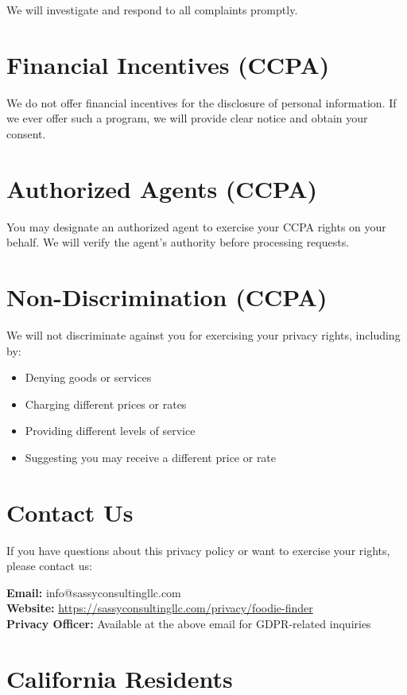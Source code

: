 \documentclass[11pt,letterpaper]{article}
\begin{document}
We will investigate and respond to all complaints promptly.

\section{Financial Incentives (CCPA)}

We do not offer financial incentives for the disclosure of personal information. If we ever offer such a program, we will provide clear notice and obtain your consent.

\section{Authorized Agents (CCPA)}

You may designate an authorized agent to exercise your CCPA rights on your behalf. We will verify the agent's authority before processing requests.

\section{Non-Discrimination (CCPA)}

We will not discriminate against you for exercising your privacy rights, including by:
\begin{itemize}
    \item Denying goods or services
    \item Charging different prices or rates
    \item Providing different levels of service
    \item Suggesting you may receive a different price or rate
\end{itemize}

\section{Contact Us}

If you have questions about this privacy policy or want to exercise your rights, please contact us:

\textbf{Email:} info@sassyconsultingllc.com \\
\textbf{Website:} \url{https://sassyconsultingllc.com/privacy/foodie-finder} \\
\textbf{Privacy Officer:} Available at the above email for GDPR-related inquiries

\section{California Residents}
\end{document}
